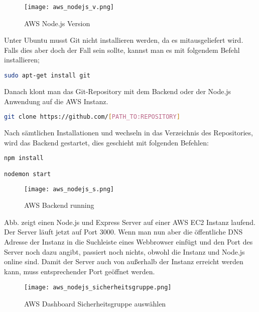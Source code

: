 \begin{center}
\begin{figure}[h]
    \centering
    \texttt{[image: aws\_nodejs\_v.png]}
    \caption{AWS Node.js Version}
\end{figure}
\end{center}

Unter Ubuntu musst Git nicht installieren werden, da es mitausgeliefert wird. Falls dies aber doch der Fall sein sollte, kannst man es mit folgendem Befehl installieren;

\begin{lstlisting}[language=bash]
sudo apt-get install git
\end{lstlisting}

Danach klont man das Git-Repository mit dem Backend oder der Node.js Anwendung auf die AWS Instanz.


\begin{lstlisting}[language=bash]
git clone https://github.com/[PATH_TO:REPOSITORY]
\end{lstlisting}

Nach sämtlichen Installationen und wechseln in das Verzeichnis des Repositories, wird das Backend gestartet, dies geschieht mit folgenden Befehlen:

\begin{lstlisting}[language=bash]
npm install

nodemon start
\end{lstlisting}

\begin{center}
\begin{figure}[h]
    \centering
    \texttt{[image: aws\_nodejs\_s.png]}
    \caption{AWS Backend running}
\end{figure}
\end{center}

Abb. zeigt einen Node.js und Express Server auf einer AWS EC2 Instanz laufend. Der Server läuft jetzt auf Port 3000. Wenn man nun aber die öffentliche DNS Adresse der Instanz in die Suchleiste eines Webbrowser einfügt und den Port des Server noch dazu angibt, passiert noch nichts, obwohl die Instanz und Node.js online sind. Damit der Server auch von außerhalb der Instanz erreicht werden kann, muss entsprechender Port geöffnet werden.

\begin{center}
\begin{figure}[h]
    \centering
    \texttt{[image: aws\_nodejs\_sicherheitsgruppe.png]}
    \caption{AWS Dashboard Sicherheitsgruppe auswählen}
\end{figure}
\end{center}


